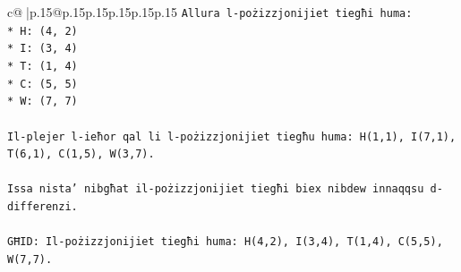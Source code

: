 \documentclass{article}
\begin{document}
{\begin{supertabular}{c@{$\;$}|p{.15\linewidth}@{}p{.15\linewidth}p{.15\linewidth}p{.15\linewidth}p{.15\linewidth}p{.15\linewidth}}
{{{\texttt{Allura l{-}pożizzjonijiet tiegħi huma:} \\
\texttt{*   H: (4, 2)} \\
\texttt{*   I: (3, 4)} \\
\texttt{*   T: (1, 4)} \\
\texttt{*   C: (5, 5)} \\
\texttt{*   W: (7, 7)} \\
\\ 
\texttt{Il{-}plejer l{-}ieħor qal li l{-}pożizzjonijiet tiegħu huma: H(1,1), I(7,1), T(6,1), C(1,5), W(3,7).} \\
\\ 
\texttt{Issa nista' nibgħat il{-}pożizzjonijiet tiegħi biex nibdew innaqqsu d{-}differenzi.} \\
\\ 
\texttt{GĦID: Il{-}pożizzjonijiet tiegħi huma: H(4,2), I(3,4), T(1,4), C(5,5), W(7,7).} \\
            }
        }
    }
     \\ \\


\end{supertabular}}
\end{document}
